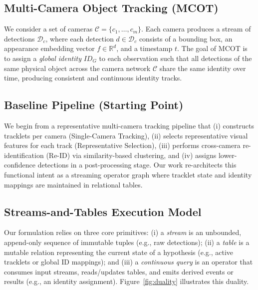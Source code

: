 \documentclass[11pt]{article}
\begin{document}
\subsection{Multi-Camera Object Tracking (MCOT)}
We consider a set of cameras $\mathcal{C} = \{c_1,\dots,c_m\}$. Each camera produces a stream of detections $\mathcal{D}_c$, where each detection $d \in \mathcal{D}_c$ consists of a bounding box, an appearance embedding vector $f \in \mathbb{R}^d$, and a timestamp $t$. The goal of MCOT is to assign a \emph{global identity} $ID_G$ to each observation such that all detections of the same physical object across the camera network $\mathcal{C}$ share the same identity over time, producing consistent and continuous identity tracks.

\subsection{Baseline Pipeline (Starting Point)}
We begin from a representative multi-camera tracking pipeline that (i) constructs tracklets per camera (Single-Camera Tracking), (ii) selects representative visual features for each track (Representative Selection), (iii) performs cross-camera re-identification (Re-ID) via similarity-based clustering, and (iv) assigns lower-confidence detections in a post-processing stage. Our work re-architects this functional intent as a streaming operator graph where tracklet state and identity mappings are maintained in relational tables.

\subsection{Streams-and-Tables Execution Model}
Our formulation relies on three core primitives: (i) a \emph{stream} is an unbounded, append-only sequence of immutable tuples (e.g., raw detections); (ii) a \emph{table} is a mutable relation representing the current state of a hypothesis (e.g., active tracklets or global ID mappings); and (iii) a \emph{continuous query} is an operator that consumes input streams, reads/updates tables, and emits derived events or results (e.g., an identity assignment). Figure~\ref{fig:duality} illustrates this duality.
\end{document}
